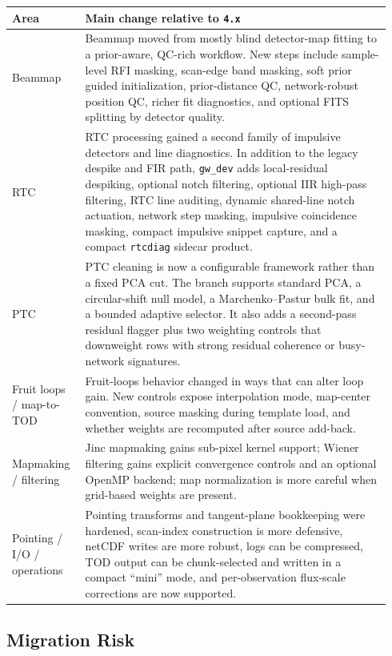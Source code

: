 \documentclass[11pt]{article}
\begin{document}
\begin{longtable}{p{0.18\linewidth} p{0.76\linewidth}}
\toprule
Area & Main change relative to \texttt{4.x} \\
\midrule
\endhead
Beammap & Beammap moved from mostly blind detector-map fitting to a prior-aware, QC-rich workflow. New steps include sample-level RFI masking, scan-edge band masking, soft prior guided initialization, prior-distance QC, network-robust position QC, richer fit diagnostics, and optional FITS splitting by detector quality. \\
RTC & RTC processing gained a second family of impulsive detectors and line diagnostics. In addition to the legacy despike and FIR path, \texttt{gw\_dev} adds local-residual despiking, optional notch filtering, optional IIR high-pass filtering, RTC line auditing, dynamic shared-line notch actuation, network step masking, impulsive coincidence masking, compact impulsive snippet capture, and a compact \texttt{rtcdiag} sidecar product. \\
PTC & PTC cleaning is now a configurable framework rather than a fixed PCA cut. The branch supports standard PCA, a circular-shift null model, a Marchenko--Pastur bulk fit, and a bounded adaptive selector. It also adds a second-pass residual flagger plus two weighting controls that downweight rows with strong residual coherence or busy-network signatures. \\
Fruit loops / map-to-TOD & Fruit-loops behavior changed in ways that can alter loop gain. New controls expose interpolation mode, map-center convention, source masking during template load, and whether weights are recomputed after source add-back. \\
Mapmaking / filtering & Jinc mapmaking gains sub-pixel kernel support; Wiener filtering gains explicit convergence controls and an optional OpenMP backend; map normalization is more careful when grid-based weights are present. \\
Pointing / I/O / operations & Pointing transforms and tangent-plane bookkeeping were hardened, scan-index construction is more defensive, netCDF writes are more robust, logs can be compressed, TOD output can be chunk-selected and written in a compact ``mini'' mode, and per-observation flux-scale corrections are now supported. \\
\bottomrule
\end{longtable}

\subsection{Migration Risk}
\end{document}
